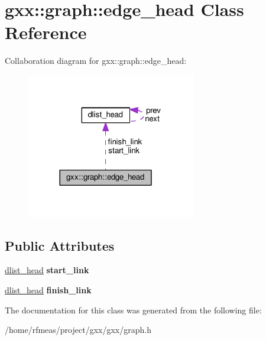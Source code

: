 \hypertarget{classgxx_1_1graph_1_1edge__head}{}\section{gxx\+:\+:graph\+:\+:edge\+\_\+head Class Reference}
\label{classgxx_1_1graph_1_1edge__head}


Collaboration diagram for gxx\+:\+:graph\+:\+:edge\+\_\+head\+:
\nopagebreak
\begin{figure}[H]
\begin{center}
\leavevmode
\includegraphics[width=209pt]{classgxx_1_1graph_1_1edge__head__coll__graph}
\end{center}
\end{figure}
\subsection*{Public Attributes}
\begin{DoxyCompactItemize}
\item 
\hyperlink{structdlist__head}{dlist\+\_\+head} {\bfseries start\+\_\+link}\hypertarget{classgxx_1_1graph_1_1edge__head_a201be15b2997c01c14cd40a006cc353c}{}\label{classgxx_1_1graph_1_1edge__head_a201be15b2997c01c14cd40a006cc353c}

\item 
\hyperlink{structdlist__head}{dlist\+\_\+head} {\bfseries finish\+\_\+link}\hypertarget{classgxx_1_1graph_1_1edge__head_a087721890a817066b6bc781a4a693da3}{}\label{classgxx_1_1graph_1_1edge__head_a087721890a817066b6bc781a4a693da3}

\end{DoxyCompactItemize}


The documentation for this class was generated from the following file\+:\begin{DoxyCompactItemize}
\item 
/home/rfmeas/project/gxx/gxx/graph.\+h\end{DoxyCompactItemize}
